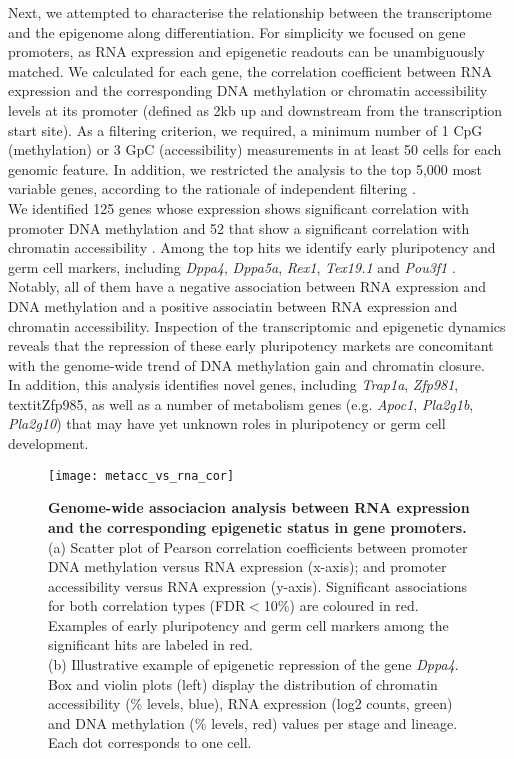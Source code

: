 Next, we attempted to characterise the relationship between the transcriptome and the epigenome along differentiation. For simplicity we focused on gene promoters, as RNA expression and epigenetic readouts can be unambiguously matched. We calculated for each gene, the correlation coefficient between RNA expression and the corresponding DNA methylation or chromatin accessibility levels at its promoter (defined as 2kb up and downstream from the transcription start site). As a filtering criterion, we required, a minimum number of 1 CpG
(methylation) or 3 GpC (accessibility) measurements in at least 50 cells for each genomic feature. In addition, we restricted the analysis to the top 5,000 most variable genes, according to the rationale of independent filtering \cite{Bourgon2010}.\\
We identified 125 genes whose expression shows significant correlation with promoter DNA methylation and 52 that show a significant correlation with chromatin accessibility .
Among the top hits we identify early pluripotency and germ cell markers, including \textit{Dppa4}, \textit{Dppa5a}, \textit{Rex1}, \textit{Tex19.1} and \textit{Pou3f1} . Notably, all of them have a negative association between RNA expression and DNA methylation and a positive associatin between RNA expression and chromatin accessibility. Inspection of the transcriptomic and epigenetic dynamics reveals that the repression of these early pluripotency markets are concomitant with the genome-wide trend of DNA methylation gain and chromatin closure.\\In addition, this analysis identifies novel genes, including \textit{Trap1a}, \textit{Zfp981}, \\textit{Zfp985}, as well as a number of metabolism genes (e.g. \textit{Apoc1}, \textit{Pla2g1b}, \textit{Pla2g10}) that may have yet unknown roles in pluripotency or germ cell development.

\begin{figure}[H]
	\centering
	\texttt{[image: metacc\_vs\_rna\_cor]}
	\caption[]{\textbf{Genome-wide associacion analysis between RNA expression and the corresponding epigenetic status in gene promoters.}\\
	(a) Scatter plot of Pearson correlation coefficients between promoter DNA methylation versus RNA expression (x-axis); and promoter accessibility versus RNA expression (y-axis). Significant associations for both correlation types (FDR$<$10\%) are coloured in red. Examples of early pluripotency and germ cell markers among the significant hits are labeled in red.\\
	(b) Illustrative example of epigenetic repression of the gene \textit{Dppa4}. Box and violin plots (left) display the distribution of chromatin accessibility (\% levels, blue), RNA expression (log2 counts, green) and DNA methylation (\% levels, red) values per stage and lineage. Each dot corresponds to one cell.
	}
	\label{fig:metacc_vs_rna_cor}
\end{figure}

